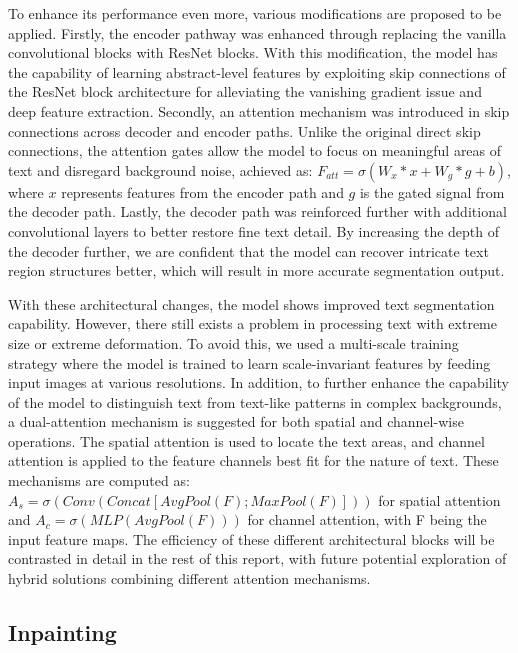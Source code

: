 \documentclass[10pt,twocolumn,letterpaper]{article}
\begin{document}
To enhance its performance even more, various modifications are proposed to be applied. Firstly, the encoder pathway was enhanced through replacing 
the vanilla convolutional blocks with ResNet blocks. With this modification, the model has the capability of learning abstract-level features 
by exploiting skip connections of the ResNet block architecture for alleviating the vanishing gradient issue and deep feature extraction. 
Secondly, an attention mechanism was introduced in skip connections across decoder and encoder paths. Unlike the original direct skip connections, 
the attention gates allow the model to focus on meaningful areas of text and disregard background noise, 
achieved as: $F_{att} = \sigma(W_x * x + W_g * g + b)$, where $x$ represents features from the encoder path and $g$ is the gated signal from the decoder path. 
Lastly, the decoder path was reinforced further with additional convolutional layers to better restore fine text detail. 
By increasing the depth of the decoder further, we are confident that the model can recover intricate text region structures better, 
which will result in more accurate segmentation output.

With these architectural changes, the model shows improved text segmentation capability. However, there still exists a problem 
in processing text with extreme size or extreme deformation. To avoid this, we used a multi-scale training strategy where the model is trained 
to learn scale-invariant features by feeding input images at various resolutions. In addition, to further enhance the capability of the model 
to distinguish text from text-like patterns in complex backgrounds, a dual-attention mechanism is suggested for both spatial and channel-wise operations. 
The spatial attention is used to locate the text areas, and channel attention is applied to the feature channels best fit for the nature of text. 
These mechanisms are computed as: $A_s = \sigma(Conv(Concat[AvgPool(F); MaxPool(F)]))$ for spatial attention and $A_c = \sigma(MLP(AvgPool(F)))$ 
for channel attention, with F being the input feature maps. The efficiency of these different architectural blocks will be contrasted 
in detail in the rest of this report, with future potential exploration of hybrid solutions combining different attention mechanisms.

\subsection{Inpainting}
\end{document}
